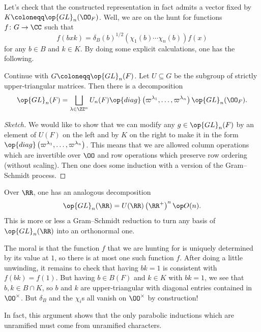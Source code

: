 \documentclass[../notes.tex]{subfiles}
\begin{document}
Let's check that the constructed representation in fact admits a vector fixed by $K\coloneqq\op{GL}_n(\OO_F)$. Well, we are on the hunt for functions $f\colon G\to\CC$ such that
\[f(bxk)=\delta_B(b)^{1/2}(\chi_1(b)\cdots\chi_n(b))f(x)\]
for any $b\in B$ and $k\in K$. By doing some explicit calculations, one has the following.
\begin{proposition}
	Continue with $G\coloneqq\op{GL}_n(F)$. Let $U\subseteq G$ be the subgroup of strictly upper-triangular matrices. Then there is a decomposition
	\[\op{GL}_n(F)=\bigsqcup_{\lambda\in\ZZ^n}U_n(F)\op{diag}\left(\varpi^{\lambda_1},\ldots,\varpi^{\lambda_n}\right)\op{GL}_n(\OO_F).\]
\end{proposition}
\begin{proof}[Sketch]
	We would like to show that we can modify any $g\in\op{GL}_n(F)$ by an element of $U(F)$ on the left and by $K$ on the right to make it in the form $\op{diag}\left(\varpi^{\lambda_1},\ldots,\varpi^{\lambda_n}\right)$. This means that we are allowed column operations which are invertible over $\OO$ and row operations which preserve row ordering (without scaling). Then one does some induction with a version of the Gram--Schmidt process.
\end{proof}
\begin{remark}
	Over $\RR$, one has an analogous decomposition
	\[\op{GL}_n(\RR)=U(\RR)\left(\RR^+\right)^n\op O(n).\]
	This is more or less a Gram--Schmidt reduction to turn any basis of $\op{GL}_n(\RR)$ into an orthonormal one.
\end{remark}
The moral is that the function $f$ that we are hunting for is uniquely determined by its value at $1$, so there is at most one such function $f$. After doing a little unwinding, it remains to check that having $bk=1$ is consistent with $f(bk)=f(1)$. But having $b\in B(F)$ and $k\in K$ with $bk=1$, we see that $b,k\in B\cap K$, so $b$ and $k$ are upper-triangular with diagonal entries contained in $\OO^\times$. But $\delta_B$ and the $\chi_i$s all vanish on $\OO^\times$ by construction!
\begin{remark}
	In fact, this argument shows that the only parabolic inductions which are unramified must come from unramified characters.
\end{remark}
\end{document}
